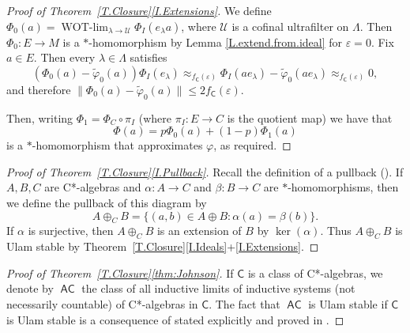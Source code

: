 \documentclass[11pt]{amsproc}
\DeclareMathOperator{\WOTlim}{WOT-\lim}
\newcommand{\cstar}{C*}
\newcommand{\sfC}{\mathsf C}
\DeclareMathOperator{\sfAC}{\mathsf {AC}}
\newcommand{\cU}{\mathcal U}
\theoremstyle{definition}
\theoremstyle{plain}
\theoremstyle{remark}
\begin{document}
\begin{proof}[Proof of Theorem~\ref{T.Closure}\eqref{I.Extensions}]
We define $\Phi_0(a)= \WOTlim_{\lambda\to \cU} \Phi_I(e_\lambda a)$, where $\cU$ is a cofinal ultrafilter on $\Lambda$. Then $\Phi_0 \colon E \to M$ is a $*$-homomorphism by Lemma \ref{L.extend.from.ideal} for $\varepsilon=0$.
Fix $a\in E$. Then every $\lambda\in \Lambda$ satisfies 
\[
(\Phi_0(a)-\tilde\varphi_0(a))\Phi_I(e_\lambda)
\approx_ {f_\sfC(\varepsilon)} \Phi_I(ae_\lambda)-\tilde \varphi_0(a e_\lambda)\approx _{f_\sfC(\varepsilon)}0, 
\]
and therefore   $\|\Phi_0(a)-\tilde \varphi_0(a)\|\leq 2f_\sfC(\varepsilon)$. 


Then, writing $\Phi_1=\Phi_C\circ \pi_I$ (where $\pi_I\colon E\to C$ is the quotient map) we have that 
\[
\Phi(a)=p \Phi_0(a) +(1-p)\Phi_1(a)
\]
is a $*$-homomorphism that approximates $\varphi$, as required. 
\end{proof}

\begin{proof}[Proof of Theorem~\ref{T.Closure}\eqref{I.Pullback}] Recall the definition of a pullback (\cite{pedersen1999pullback}). If $A,B,C$ are \cstar-algebras and $\alpha\colon A\to C$ and $\beta\colon B\to C$ are $*$-homomorphisms, then we define the pullback of this diagram by 
\[
A\oplus_C B =\{(a,b)\in A\oplus B: \alpha(a)=\beta(b)\}. 
\]
If $\alpha$ is surjective, then $A\oplus_C B$ is an extension of $B$ by $\ker(\alpha)$. Thus $A\oplus_C B$ is Ulam stable by Theorem~\ref{T.Closure}\eqref{I.Ideals}+\eqref{I.Extensions}. 
\end{proof}

\begin{proof}[Proof of Theorem~\ref{T.Closure}\eqref{thm:Johnson}] If $\sfC$ is a class of \cstar-algebras, we denote by $\sfAC$ the class of all inductive limits of inductive systems (not necessarily countable) of \cstar-algebras in $\sfC$. The fact that $\sfAC$ is Ulam stable if $\sfC$ is Ulam stable is a consequence of \cite{johnson1988approximately} stated explicitly and proved in \cite[Theorem~3.1]{MV}. 
\end{proof}
\end{document}
